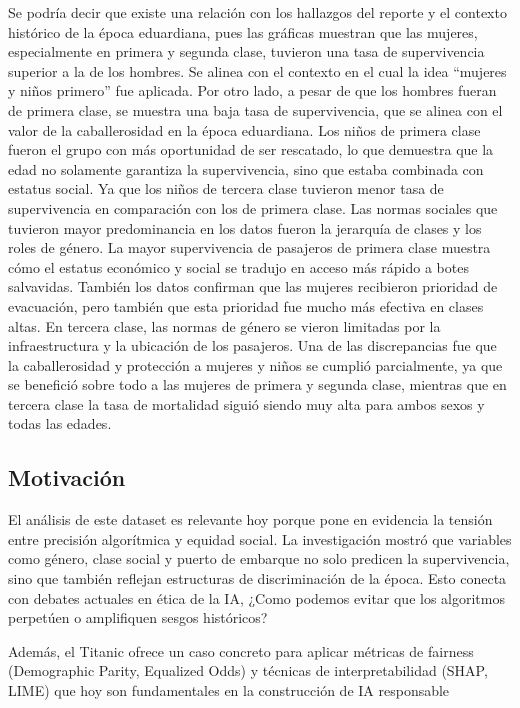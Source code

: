 \documentclass[sjournal]{IEEEtran}
\begin{document}
Se podría decir que existe una relación con los hallazgos del reporte y el contexto histórico de la época eduardiana, pues las gráficas muestran que las mujeres, especialmente en primera y segunda clase, tuvieron una tasa de supervivencia superior a la de los hombres. Se alinea con el contexto en el cual la idea “mujeres y niños primero” fue aplicada. Por otro lado, a pesar de que los hombres fueran de primera clase, se muestra una baja tasa de supervivencia, que se alinea con el valor de la caballerosidad en la época eduardiana. Los niños de primera clase fueron el grupo con más oportunidad de ser rescatado, lo que demuestra que la edad no solamente garantiza la supervivencia, sino que estaba combinada con estatus social. Ya que los niños de tercera clase tuvieron menor tasa de supervivencia en comparación con los de primera clase. Las normas sociales que tuvieron mayor predominancia en los datos fueron la jerarquía de clases y los roles de género. La mayor supervivencia de pasajeros de primera clase muestra cómo el estatus económico y social se tradujo en acceso más rápido a botes salvavidas. También los datos confirman que las mujeres recibieron prioridad de evacuación, pero también que esta prioridad fue mucho más efectiva en clases altas. En tercera clase, las normas de género se vieron limitadas por la infraestructura y la ubicación de los pasajeros. Una de las discrepancias fue que la caballerosidad y protección a mujeres y niños se cumplió parcialmente, ya que se benefició sobre todo a las mujeres de primera y segunda clase, mientras que en tercera clase la tasa de mortalidad siguió siendo muy alta para ambos sexos y todas las edades.

\subsection{Motivación}

El análisis de este dataset es relevante hoy porque pone en evidencia la tensión entre precisión algorítmica y equidad social. La investigación mostró que variables como género, clase social y puerto de embarque no solo predicen la supervivencia, sino que también reflejan estructuras de discriminación de la época. Esto conecta con debates actuales en ética de la IA, ¿Como podemos evitar que los algoritmos perpetúen o amplifiquen sesgos históricos?

Además, el Titanic ofrece un caso concreto para aplicar métricas de fairness (Demographic Parity, Equalized Odds) y técnicas de interpretabilidad (SHAP, LIME) que hoy son fundamentales en la construcción de IA responsable
\end{document}
